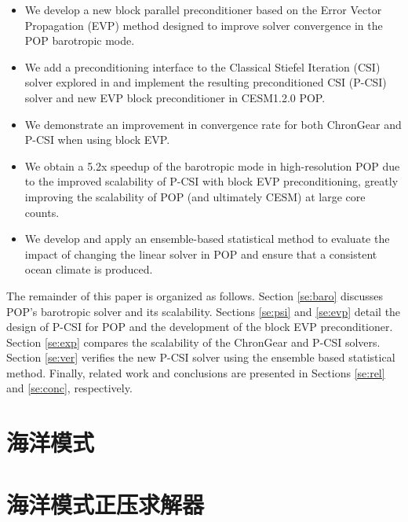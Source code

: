

\begin{itemize}
\item We develop a new block parallel preconditioner based on the
Error Vector Propagation (EVP) method \cite{roache1995elliptic} designed to
improve solver convergence in the POP barotropic mode.
\item We add a preconditioning interface to the Classical Stiefel Iteration
(CSI) solver explored in \cite{hu2013scalable} and
implement the resulting preconditioned CSI (P-CSI) solver
and new EVP block preconditioner in CESM1.2.0 POP.
\item We demonstrate an improvement in convergence rate for both ChronGear and
P-CSI when using block EVP.
\item We obtain a 5.2x speedup of
  the barotropic mode in high-resolution POP due to the improved scalability
of P-CSI with block EVP preconditioning, greatly improving the
scalability of POP (and ultimately CESM) at large core counts.
\item We develop and apply an ensemble-based statistical method to evaluate the impact
of changing the linear solver in POP and ensure that a consistent ocean climate is produced.
\end{itemize}

The remainder of this paper is organized as follows.
Section \ref{se:baro} discusses POP's barotropic solver and its scalability.
Sections \ref{se:psi} and \ref{se:evp} detail the design
of P-CSI for POP and the development of the block EVP preconditioner.
Section \ref{se:exp} compares the scalability of the ChronGear and
P-CSI solvers.  Section \ref{se:ver} verifies the new P-CSI solver
using the ensemble based statistical method.
Finally,  related work and conclusions are presented in Sections
\ref{se:rel} and \ref{se:conc}, respectively.



\cite{kocher99}

\section{海洋模式}
\section{海洋模式正压求解器}

